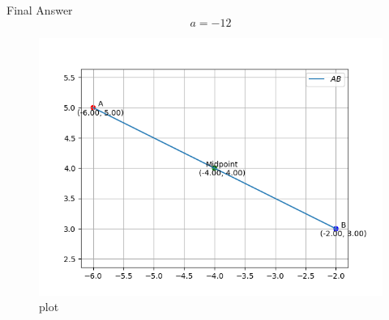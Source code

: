\documentclass{beamer}
\begin{document}
\begin{frame}{Final Answer}
\[
\boxed{a = -12}
\]
\end{frame}
\begin{figure}[H]
\centering
\includegraphics[width=0.75\columnwidth]{figs/1.png}
\caption{\centering plot}
\label{fig:placeholder_125}
\end{figure}
\end{document}
